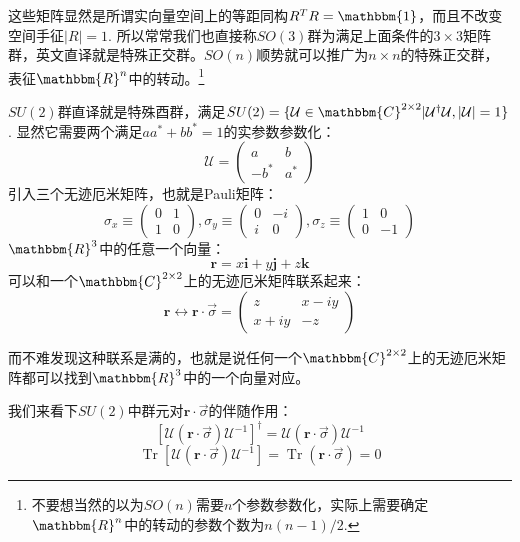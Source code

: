 这些矩阵显然是所谓实向量空间上的等距同构$R^TR=\mathbbm{1}$，而且不改变空间手征$|R|=1$. 所以常常我们也直接称$SO(3)$群为满足上面条件的$3\times 3$矩阵群，英文直译就是特殊正交群。$SO(n)$顺势就可以推广为$n\times n$的特殊正交群，表征$\mathbbm{R}^n$中的转动。\footnote{不要想当然的以为$SO(n)$需要$n$个参数参数化，实际上需要确定$\mathbbm{R}^n$中的转动的参数个数为$n(n-1)/2$.}

$SU(2)$群直译就是特殊酉群，满足$SU(2)=\{\mathcal{U}\in\mathbbm{C}^{2\times 2}|\mathcal{U}^\dagger \mathcal{U},|\mathcal{U}|=1\}$. 显然它需要两个满足$aa^*+bb^*=1$的实参数参数化：
\[\mathcal{U}=\left( {\begin{array}{*{20}{c}}
		a&b \\ 
		{ - {b^*}}&{{a^*}} 
\end{array}} \right)\]
引入三个无迹厄米矩阵，也就是Pauli矩阵：
\begin{equation}
		\sigma_x\equiv\begin{pmatrix}
			0&1\\
			1&0
		\end{pmatrix},
		\sigma_y\equiv\begin{pmatrix}
			0&-i\\
			i&0
		\end{pmatrix},
		\sigma_z\equiv\begin{pmatrix}
			1&0\\
			0&-1
		\end{pmatrix}
\end{equation}
$\mathbbm{R}^3$中的任意一个向量：
\[\mathbf{r}=x\mathbf{i}+y\mathbf{j}+z\mathbf{k}\]
可以和一个$\mathbbm{C}^{2\times 2}$上的无迹厄米矩阵联系起来：
\[\mathbf{r}\leftrightarrow\mathbf{r}\cdot\vec{\sigma}=\left( {\begin{array}{*{20}{c}}
		z&{x - iy} \\ 
		{x + iy}&{ - z} 
\end{array}} \right)\]

而不难发现这种联系是满的，也就是说任何一个$\mathbbm{C}^{2\times 2}$上的无迹厄米矩阵都可以找到$\mathbbm{R}^3$中的一个向量对应。

我们来看下$SU(2)$中群元对$\mathbf{r}\cdot\vec{\sigma}$的伴随作用：
\[\left[\mathcal{U}(\mathbf{r}\cdot\vec{\sigma})\mathcal{U}^{-1}\right]^\dagger=\mathcal{U}(\mathbf{r}\cdot\vec{\sigma})\mathcal{U}^{-1}\]
\[\operatorname{Tr}\left[\mathcal{U}(\mathbf{r}\cdot\vec{\sigma})\mathcal{U}^{-1}\right]=\operatorname{Tr}(\mathbf{r}\cdot\vec{\sigma})=0\]

